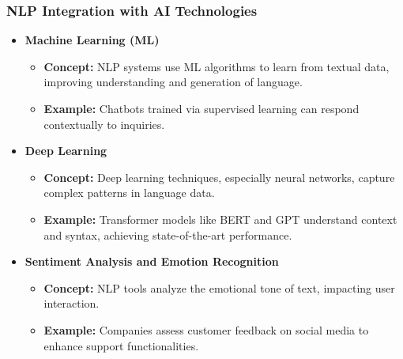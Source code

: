 \documentclass[aspectratio=169]{beamer}
\begin{document}
\begin{frame}[fragile]
    \frametitle{NLP Integration with AI Technologies}
    \begin{itemize}
        \item \textbf{Machine Learning (ML)}
            \begin{itemize}
                \item \textbf{Concept:} NLP systems use ML algorithms to learn from textual data, improving understanding and generation of language.
                \item \textbf{Example:} Chatbots trained via supervised learning can respond contextually to inquiries.
            \end{itemize}
        \item \textbf{Deep Learning}
            \begin{itemize}
                \item \textbf{Concept:} Deep learning techniques, especially neural networks, capture complex patterns in language data.
                \item \textbf{Example:} Transformer models like BERT and GPT understand context and syntax, achieving state-of-the-art performance.
            \end{itemize}
        \item \textbf{Sentiment Analysis and Emotion Recognition}
            \begin{itemize}
                \item \textbf{Concept:} NLP tools analyze the emotional tone of text, impacting user interaction.
                \item \textbf{Example:} Companies assess customer feedback on social media to enhance support functionalities.
            \end{itemize}
    \end{itemize}
\end{frame}
\end{document}
